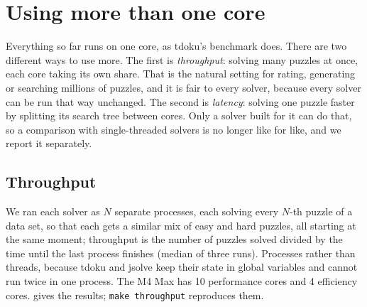 \documentclass[11pt]{article}
\theoremstyle{definition}
\theoremstyle{plain}
\begin{document}
\section{Using more than one core}
\label{sec:multicore}

Everything so far runs on one core, as tdoku's benchmark does. There are two different ways to use more. The first is
\emph{throughput}: solving many puzzles at once, each core taking its own share. That is the natural setting for
rating, generating or searching millions of puzzles, and it is fair to every solver, because every solver can be run
that way unchanged. The second is \emph{latency}: solving one puzzle faster by splitting its search tree between cores.
Only a solver built for it can do that, so a comparison with single-threaded solvers is no longer like for like, and we
report it separately.

\subsection{Throughput}

We ran each solver as $N$ separate processes, each solving every $N$-th puzzle of a data set, so that each gets a similar
mix of easy and hard puzzles, all starting at the same moment; throughput is the number of puzzles solved divided by the time until the last process finishes (median of three
runs). Processes rather than threads, because tdoku and jsolve keep their state in global variables and cannot run
twice in one process. The M4 Max has 10 performance cores and 4 efficiency cores.  gives the
results; \texttt{make throughput} reproduces them.
\end{document}
